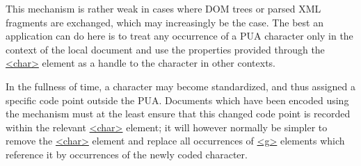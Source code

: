 This mechanism is rather weak in cases where DOM trees or parsed XML fragments are exchanged, which may increasingly be the case. The best an application can do here is to treat any occurrence of a PUA character only in the context of the local document and use the properties provided through the \hyperref[TEI.char]{<char>} element as a handle to the character in other contexts.\par
In the fullness of time, a character may become standardized, and thus assigned a specific code point outside the PUA. Documents which have been encoded using the mechanism must at the least ensure that this changed code point is recorded within the relevant \hyperref[TEI.char]{<char>} element; it will however normally be simpler to remove the \hyperref[TEI.char]{<char>} element and replace all occurrences of \hyperref[TEI.g]{<g>} elements which reference it by occurrences of the newly coded character.
